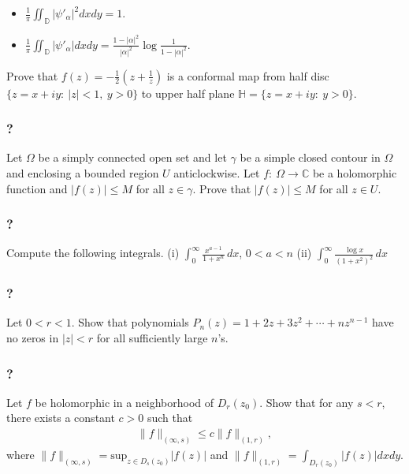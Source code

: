 \begin{itemize}
\item
  \(\displaystyle{\frac{1}{\pi}\iint_{{\mathbb D}} |\psi'_{\alpha}|^2 dx dy =1}\).
\item
  \(\displaystyle{\frac{1}{\pi}\iint_{{\mathbb D}} |\psi'_{\alpha}| dx dy =\frac{1-|\alpha|^2}{|\alpha|^2} \log \frac{1}{1-|\alpha|^2}}\).
\end{itemize}

Prove that
\(\displaystyle{f(z)=-\frac{1}{2}\left(z+\frac{1}{z}\right)}\) is a
conformal map from half disc \(\{z=x+iy:\ |z|<1,\ y>0\}\) to upper half
plane \(\mathbb H=\{z=x+iy:\ y>0\}\).

\hypertarget{section-182}{%
\subsubsection{?}\label{section-182}}

Let \(\Omega\) be a simply connected open set and let \(\gamma\) be a
simple closed contour in \(\Omega\) and enclosing a bounded region \(U\)
anticlockwise. Let \(f: \ \Omega \to {\mathbb C}\) be a holomorphic
function and \(|f(z)|\leq M\) for all \(z\in \gamma\). Prove that
\(|f(z)|\leq M\) for all \(z\in U\).

\hypertarget{section-183}{%
\subsubsection{?}\label{section-183}}

Compute the following integrals. (i)
\(\displaystyle \int_0^\infty \frac{x^{a-1}}{1 + x^n} \, dx\),
\(0< a < n\) (ii)
\(\displaystyle \int_0^\infty \frac{\log x}{(1 + x^2)^2}\, dx\)

\hypertarget{section-184}{%
\subsubsection{?}\label{section-184}}

Let \(0<r<1\). Show that polynomials
\(P_n(z) = 1 + 2z + 3 z^2 + \cdots + n z^{n-1}\) have no zeros in
\(|z|<r\) for all sufficiently large \(n\)'s.

\hypertarget{section-185}{%
\subsubsection{?}\label{section-185}}

Let \(f\) be holomorphic in a neighborhood of \(D_r(z_0)\). Show that
for any \(s<r\), there exists a constant \(c>0\) such that
\begin{align*}\|f\|_{(\infty, s)} \leq c \|f\|_{(1, r)},\end{align*}
where
\(\displaystyle \|f\|_{(\infty, s)} = \text{sup}_{z \in D_s(z_0)}|f(z)|\)
and \(\displaystyle \|f\|_{(1, r)} = \int_{D_r(z_0)} |f(z)|dx dy\).

